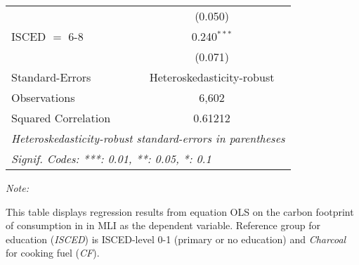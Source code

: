 \begin{table}[htbp!]
\begin{adjustbox}{width = 1\textwidth, max height = 0.95\textheight, center}
\begin{threeparttable}[b]
\begin{tabular}{lc}
                                & (0.050)\\   
            ISCED $=$ 6-8       & 0.240$^{***}$\\   
                                & (0.071)\\   
            \midrule 
            Standard-Errors     & Heteroskedasticity-robust \\   
            Observations        & 6,602\\  
            Squared Correlation & 0.61212\\  
            \midrule \midrule
            \multicolumn{2}{l}{\emph{Heteroskedasticity-robust standard-errors in parentheses}}\\
            \multicolumn{2}{l}{\emph{Signif. Codes: ***: 0.01, **: 0.05, *: 0.1}}\\
         \end{tabular}
         
         \begin{tablenotes}\item \medskip \textit{Note:}
            \item This table displays regression results from equation OLS on the carbon footprint of consumption in  in MLI as the dependent variable.  Reference group for education (\textit{ISCED}) is ISCED-level 0-1 (primary or no education) and \textit{Charcoal} for cooking fuel (\textit{CF}).
         \end{tablenotes}
      \end{threeparttable}
   \end{adjustbox}
\end{table}


